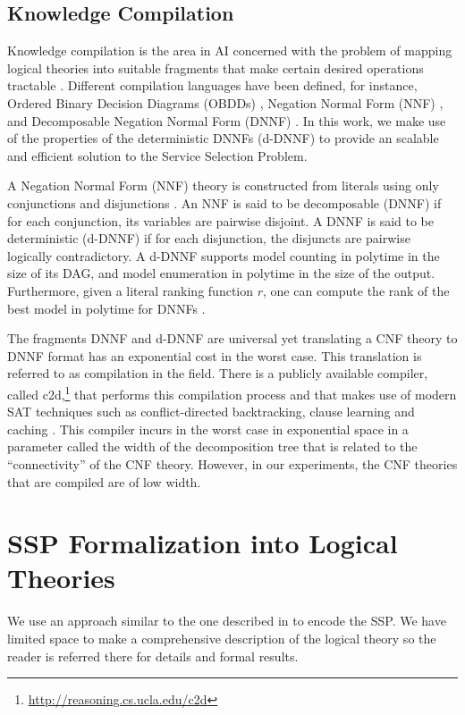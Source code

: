 \documentclass{llncs}
\begin{document}
{\subsection{Knowledge Compilation}

Knowledge compilation is the area in AI concerned with the problem of mapping
logical theories into suitable fragments that make certain desired operations
tractable \cite{cadoli:compilation}. Different compilation languages have been
defined, for instance, Ordered Binary Decision Diagrams (OBDDs) \cite{bryant:obdd},
Negation Normal Form (NNF) \cite{barwise:handbook}, and Decomposable Negation
Normal Form (DNNF) \cite{darwiche:map}. In this work, we make use of the properties
of the deterministic DNNFs (d-DNNF) \cite{darwiche:d-dnnfs} to provide an scalable
and efficient solution to the Service Selection Problem. 

A Negation Normal Form (NNF) theory is constructed from literals using only conjunctions
and disjunctions \cite{barwise:handbook}. An NNF is said to be decomposable (DNNF) \cite{darwiche:d-dnnfs} if for each conjunction, its variables are pairwise disjoint. A DNNF is said to be deterministic (d-DNNF) \cite{darwiche:d-dnnfs} if for each disjunction, the disjuncts are pairwise logically contradictory. A d-DNNF supports model counting in polytime in the size of its DAG, and model
enumeration in polytime in the size of the output.
Furthermore, given a literal ranking function $r$, one can compute the rank
of the best model in polytime for DNNFs \cite{darwiche:weighted}.

The fragments DNNF and d-DNNF are universal yet translating a CNF theory 
to DNNF format has an exponential cost in the worst case. This translation
is referred to as compilation in the field. There is a publicly available
compiler, called c2d,\footnote{\url{http://reasoning.cs.ucla.edu/c2d}}
that performs this compilation process and that makes
use of modern SAT techniques such as conflict-directed backtracking,
clause learning and caching \cite{darwiche:compiler}.
This compiler incurs in the worst case in exponential space in a parameter
called the width of the decomposition tree that is related to the ``connectivity''
of the CNF theory. However, in our experiments, the CNF theories that are
compiled are of low width.

\section{SSP Formalization into Logical Theories}
We use an approach similar to the one described in \cite{arvelo:aaai06} to
encode the SSP. We have limited space to make a comprehensive description of
the logical theory so the reader is referred there for details and formal results.

}
\end{document}
